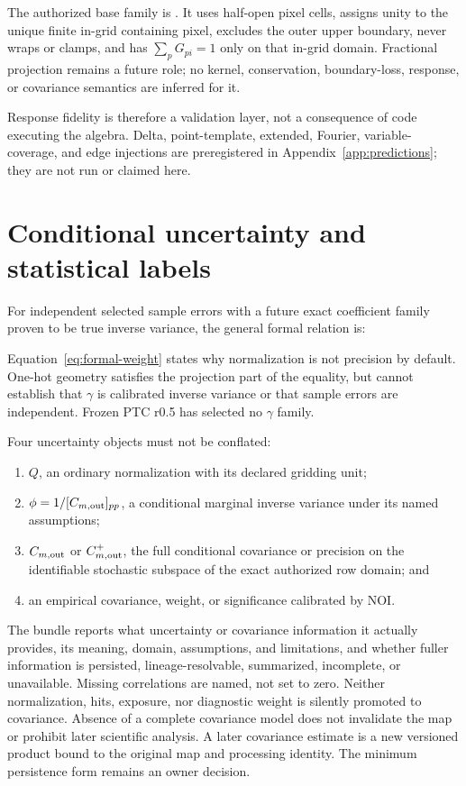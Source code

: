 \documentclass[10pt]{article}
\begin{document}
The authorized base family is
\SCIMapOneHotProfile. It uses half-open pixel cells,
assigns unity to the unique finite in-grid containing pixel, excludes the
outer upper boundary, never wraps or clamps, and has \(\sum_pG_{pi}=1\) only
on that in-grid domain. Fractional projection remains a future role; no
kernel, conservation, boundary-loss, response, or covariance semantics are
inferred for it.

Response fidelity is therefore a validation layer, not a consequence of code
executing the algebra. Delta, point-template, extended, Fourier, variable-
coverage, and edge injections are preregistered in Appendix~\ref{app:predictions};
they are not run or claimed here.

\clearpage
\section{Conditional uncertainty and statistical labels}

For independent selected sample errors with a future exact coefficient family
proven to be true inverse variance, the general formal relation is:

\SCIMapFormalWeightEquations

Equation~\eqref{eq:formal-weight} states why normalization is not precision by
default. One-hot geometry satisfies the projection part of the equality, but
cannot establish that \(\gamma\) is calibrated inverse variance or that sample
errors are independent. Frozen PTC r0.5 has selected no \(\gamma\) family.

Four uncertainty objects must not be conflated:

\begin{enumerate}
\item \(Q\), an ordinary normalization with its declared gridding unit;
\item \(\phi=1/[C_{m,{\rm out}}]_{pp}\), a conditional marginal inverse
variance under
its named assumptions;
\item \(C_{m,{\rm out}}\) or \(C_{m,{\rm out}}^+\), the full conditional
covariance or precision on the identifiable stochastic subspace of the exact
authorized row domain; and
\item an empirical covariance, weight, or significance calibrated by NOI.
\end{enumerate}

The bundle reports what uncertainty or covariance information it actually
provides, its meaning, domain, assumptions, and limitations, and whether fuller
information is persisted, lineage-resolvable, summarized, incomplete, or
unavailable. Missing correlations are named, not set to zero. Neither
normalization, hits, exposure, nor diagnostic weight is silently promoted to
covariance. Absence of a complete covariance model does not invalidate the map
or prohibit later scientific analysis. A later covariance estimate is a new
versioned product bound to the original map and processing identity. The
minimum persistence form remains an owner decision.
\end{document}
